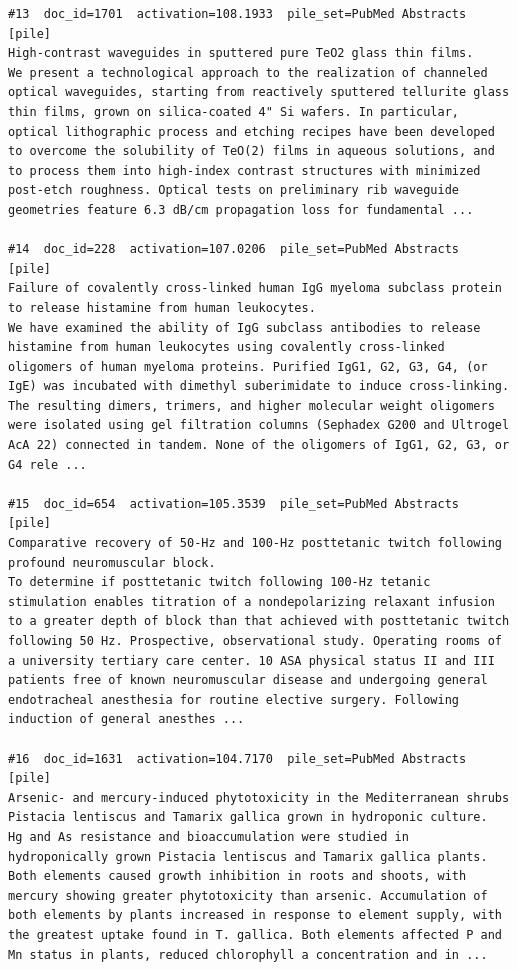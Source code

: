 \begin{verbatim}
#13  doc_id=1701  activation=108.1933  pile_set=PubMed Abstracts  [pile]
High-contrast waveguides in sputtered pure TeO2 glass thin films.
We present a technological approach to the realization of channeled optical waveguides, starting from reactively sputtered tellurite glass thin films, grown on silica-coated 4" Si wafers. In particular, optical lithographic process and etching recipes have been developed to overcome the solubility of TeO(2) films in aqueous solutions, and to process them into high-index contrast structures with minimized post-etch roughness. Optical tests on preliminary rib waveguide geometries feature 6.3 dB/cm propagation loss for fundamental ...

#14  doc_id=228  activation=107.0206  pile_set=PubMed Abstracts  [pile]
Failure of covalently cross-linked human IgG myeloma subclass protein to release histamine from human leukocytes.
We have examined the ability of IgG subclass antibodies to release histamine from human leukocytes using covalently cross-linked oligomers of human myeloma proteins. Purified IgG1, G2, G3, G4, (or IgE) was incubated with dimethyl suberimidate to induce cross-linking. The resulting dimers, trimers, and higher molecular weight oligomers were isolated using gel filtration columns (Sephadex G200 and Ultrogel AcA 22) connected in tandem. None of the oligomers of IgG1, G2, G3, or G4 rele ...

#15  doc_id=654  activation=105.3539  pile_set=PubMed Abstracts  [pile]
Comparative recovery of 50-Hz and 100-Hz posttetanic twitch following profound neuromuscular block.
To determine if posttetanic twitch following 100-Hz tetanic stimulation enables titration of a nondepolarizing relaxant infusion to a greater depth of block than that achieved with posttetanic twitch following 50 Hz. Prospective, observational study. Operating rooms of a university tertiary care center. 10 ASA physical status II and III patients free of known neuromuscular disease and undergoing general endotracheal anesthesia for routine elective surgery. Following induction of general anesthes ...

#16  doc_id=1631  activation=104.7170  pile_set=PubMed Abstracts  [pile]
Arsenic- and mercury-induced phytotoxicity in the Mediterranean shrubs Pistacia lentiscus and Tamarix gallica grown in hydroponic culture.
Hg and As resistance and bioaccumulation were studied in hydroponically grown Pistacia lentiscus and Tamarix gallica plants. Both elements caused growth inhibition in roots and shoots, with mercury showing greater phytotoxicity than arsenic. Accumulation of both elements by plants increased in response to element supply, with the greatest uptake found in T. gallica. Both elements affected P and Mn status in plants, reduced chlorophyll a concentration and in ...


\end{verbatim}
